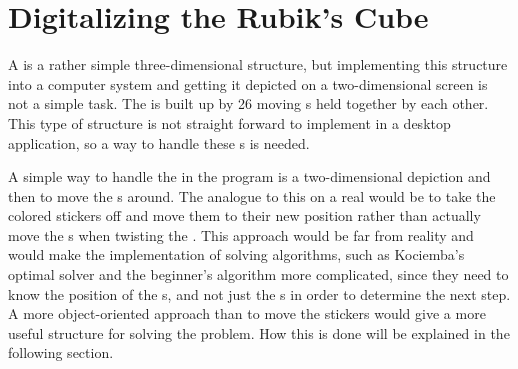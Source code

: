 \chapter{Digitalizing the Rubik's Cube}
A \rubik{} is a rather simple three-dimensional structure, but implementing this structure into a computer system and getting it depicted on a two-dimensional screen is not a simple task.
The \rubik{} is built up by 26 moving \cpiece{}s held together by each other.
This type of structure is not straight forward to implement in a desktop application, so a way to handle these \cpiece{}s is needed.

A simple way to handle the \rubik{} in the program is a two-dimensional depiction and then to move the \facelet{}s around.
The analogue to this on a real \rubik{} would be to take the colored stickers off and move them to their new position rather than actually move the \cubie{}s when twisting the \rubik{}.
This approach would be far from reality and would make the implementation of solving algorithms, such as Kociemba's optimal solver and the beginner's algorithm more complicated, since they need to know the position of the \cpiece{}s, and not just the \facelet{}s in order to determine the next step. 
A more object-oriented approach than to move the stickers would give a more useful structure for solving the problem.
How this is done will be explained in the following section.
	
	
